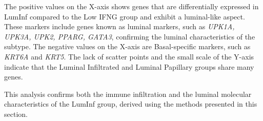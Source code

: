 The positive values on the X-axis shows genes that are differentially expressed in LumInf compared to the Low IFNG group and exhibit a luminal-like aspect. These markers include genes known as luminal markers, such as \textit{UPK1A, UPK3A, UPK2, PPARG, GATA3}, confirming the luminal characteristics of the subtype. The negative values on the X-axis are Basal-specific markers, such as \textit{KRT6A} and \textit{KRT5}. The lack of scatter points and the small scale of the Y-axis indicate that the Luminal Infiltrated and Luminal Papillary groups share many genes.

This analysis confirms both the immune infiltration and the luminal molecular characteristics of the LumInf group, derived using the methods presented in this section.

